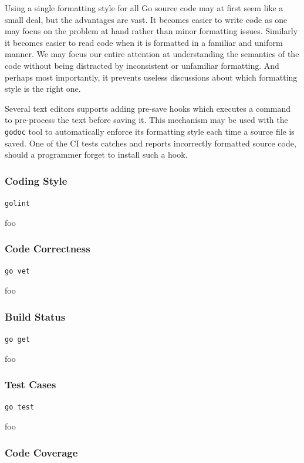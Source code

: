 \documentclass[12pt, a4paper]{article}
\begin{document}
Using a single formatting style for all Go source code may at first seem like a small deal, but the advantages are vast. It becomes easier to write code as one may focus on the problem at hand rather than minor formatting issues. Similarly it becomes easier to read code when it is formatted in a familiar and uniform manner. We may focus our entire attention at understanding the semantics of the code without being distracted by inconsistent or unfamiliar formatting. And perhaps most importantly, it prevents useless discussions about which formatting style is the right one.

Several text editors supports adding pre-save hooks which executes a command to pre-process the text before saving it. This mechanism may be used with the \texttt{godoc} tool to automatically enforce its formatting style each time a source file is saved. One of the CI tests catches and reports incorrectly formatted source code, should a programmer forget to install such a hook.

\subsubsection{Coding Style}

\texttt{golint}

foo

\subsubsection{Code Correctness}

\texttt{go vet}

foo

\subsubsection{Build Status}

\texttt{go get}

foo

\subsubsection{Test Cases}

\texttt{go test}

foo

\subsubsection{Code Coverage}
\end{document}
